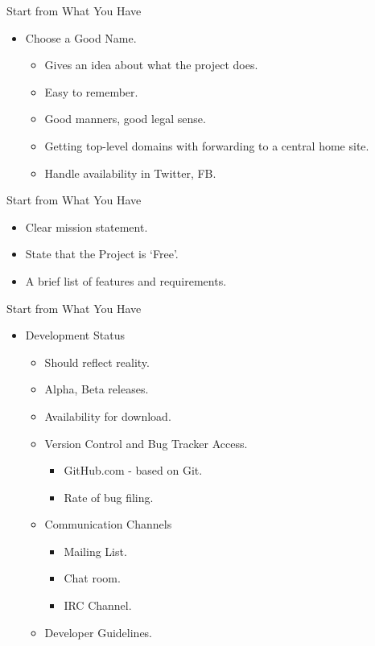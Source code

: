 \documentclass{beamer}
\begin{document}
\begin{frame}{Start from What You Have}
\begin{itemize}
	\item Choose a Good Name. 
	\begin{itemize}
		\item Gives an idea about what the project does.
		\item Easy to remember. 
		\item Good manners, good legal sense. 
		\item Getting top-level domains with forwarding to a central home site. 
		\item Handle availability in Twitter, FB.	
	\end{itemize}
\end{itemize}
\end{frame}

\begin{frame}{Start from What You Have}
\begin{itemize}
	\item Clear mission statement.
	\item State that the Project is `Free'. 
	\item A brief list of features and requirements.
\end{itemize}
\end{frame}

\begin{frame}{Start from What You Have}
\begin{itemize}
	\item Development Status 
	\begin{itemize}
		\item Should reflect reality.
		\item Alpha, Beta releases. 
		\item Availability for download. 
		\item Version Control and Bug Tracker Access. 
		\begin{itemize}
			\item GitHub.com - based on Git. 
			\item Rate of bug filing. 
		\end{itemize}
		\item Communication Channels
		\begin{itemize}
			\item Mailing List. 
			\item Chat room. 
			\item IRC Channel. 
		\end{itemize}
		\item Developer Guidelines. 
	\end{itemize}		
\end{itemize}
\end{frame}
\end{document}
